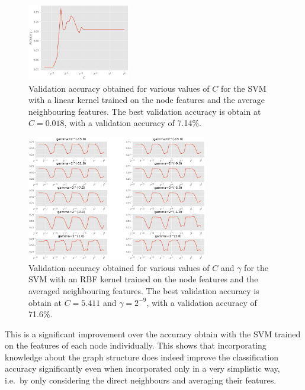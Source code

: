 \documentclass[12pt]{article}
\theoremstyle{definition}
\begin{document}
\begin{figure}[H]
	\includegraphics[width=0.4\textwidth]{average_svm/linear_reg}
	\centering
	\caption{Validation accuracy obtained for various values of $C$ for the SVM with a linear kernel trained on the node features and the average neighbouring features. The best validation accuracy is obtain at $C=0.018$, with a validation accuracy of 7.14\%.}
	\label{fig/average_svm_linear_reg}
\end{figure}
\begin{figure}[H]
	\includegraphics[width=0.7\textwidth]{average_svm/rbf_reg}
	\centering
	\caption{Validation accuracy obtained for various values of $C$ and $\gamma$ for the SVM with an RBF kernel trained on the node features and the averaged neighbouring features. The best validation accuracy is obtain at $C=5.411$ and $\gamma=2^{-9}$, with a validation accuracy of 71.6\%.}
	\label{fig/average_svm_rbf_reg}
\end{figure}

\bigskip

This is a significant improvement over the accuracy obtain with the SVM trained on the features of each node individually. This shows that incorporating knowledge about the graph structure does indeed improve the classification accuracy significantly even when incorporated only in a very simplistic way, i.e.\ by only considering the direct neighbours and averaging their features.
\end{document}
